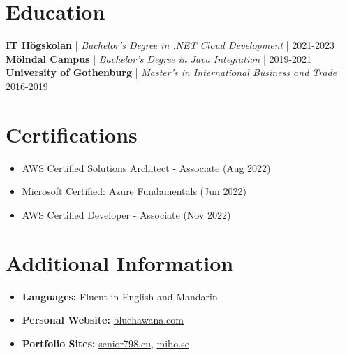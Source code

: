 \documentclass[11pt,a4paper]{article}
\begin{document}
\section*{Education}
\textbf{IT Högskolan} | \textit{Bachelor's Degree in .NET Cloud Development} | 2021-2023\\
\textbf{Mölndal Campus} | \textit{Bachelor's Degree in Java Integration} | 2019-2021\\
\textbf{University of Gothenburg} | \textit{Master's in International Business and Trade} | 2016-2019

\section*{Certifications}
\begin{itemize}[noitemsep]
\item AWS Certified Solutions Architect - Associate (Aug 2022)
\item Microsoft Certified: Azure Fundamentals (Jun 2022)
\item AWS Certified Developer - Associate (Nov 2022)
\end{itemize}

\section*{Additional Information}
\begin{itemize}[noitemsep]
\item \textbf{Languages:} Fluent in English and Mandarin
\item \textbf{Personal Website:} \href{https://www.bluehawana.com}{bluehawana.com}
\item \textbf{Portfolio Sites:} \href{https://www.senior798.eu}{senior798.eu}, \href{https://www.mibo.se}{mibo.se}
\end{itemize}
\end{document}
